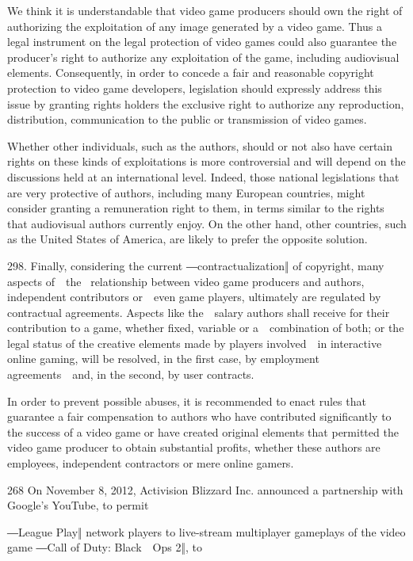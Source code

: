 \documentclass[
]{article}
\begin{document}
{We think it is understandable that video game producers should own the
right of authorizing the exploitation of any image generated by a video
game. Thus a legal }{instrument on the legal protection of video games
could also guarantee the producer's }{right to authorize any
exploitation of the game, including audiovisual elements. Consequently,
in order to concede a fair and reasonable copyright protection to video
game developers, legislation should expressly address this issue by
granting rights holders the exclusive right to authorize any
reproduction, distribution, communication to the public or transmission
of video games.}

{Whether other individuals, such as the authors, should or not also have
certain rights on these kinds of exploitations is more controversial and
will depend on the discussions held at an international level. Indeed,
those national legislations that are very protective of authors,
including many European countries, might consider granting a
remuneration right to them, in terms similar to the rights that
audiovisual authors currently enjoy. On the other hand, other countries,
such as the United States of America, are likely to prefer the opposite
solution.}

{298. }{Finally, considering the current ―}{contractualization}{‖ of
copyright, many aspects of~~the }{~relationship between video game
producers and authors, independent contributors or~~even game players,
ultimately are regulated by contractual agreements. Aspects like
the~~salary authors shall receive for their contribution to a game,
whether fixed, variable or a~~combination of both; or the legal status
of the creative elements made by players involved~~in interactive online
gaming, will be resolved, in the first case, by employment
agreements~~and, in the second, by user contracts.}

{In order to prevent possible abuses, it is recommended to enact rules
that guarantee a fair compensation to authors who have contributed
significantly to the success of a video game or have created original
elements that permitted the video game producer to obtain substantial
profits, whether these authors are employees, independent contractors or
mere online gamers.}

{268 }{On November 8, 2012, Activision }{Blizzard Inc. announced a
partnership with Google's YouTube, to permit}

{―League Play‖ network players to live}{-}{stream multiplayer gameplays
of the video game ―Call of Duty: Black~~Ops 2‖, to}
\end{document}
